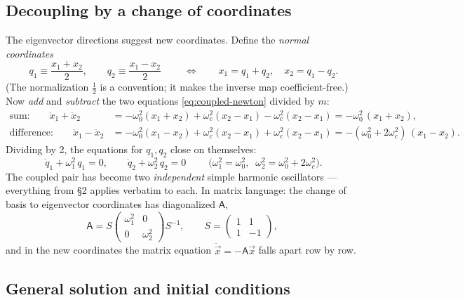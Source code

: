 \documentclass[11pt]{article}
\theoremstyle{plain}
\theoremstyle{definition}
\theoremstyle{remark}
\newcommand{\vx}{\vec{x}}
\newcommand{\mA}{\mathsf{A}}
\begin{document}
\subsection{Decoupling by a change of coordinates}
\label{sec:normal-coords}

The eigenvector directions suggest new coordinates. Define the \emph{normal
coordinates}
\begin{equation}
  \boxed{\;
  q_1 \equiv \frac{x_1 + x_2}{2},
  \qquad
  q_2 \equiv \frac{x_1 - x_2}{2}
  \;}
  \qquad\Longleftrightarrow\qquad
  x_1 = q_1 + q_2, \quad x_2 = q_1 - q_2 .
\end{equation}
(The normalization $\tfrac12$ is a convention; it makes the inverse map
coefficient-free.) Now \emph{add} and \emph{subtract} the two equations
\eqref{eq:coupled-newton} divided by $m$:
\begin{align}
  \text{sum:}\qquad
  \ddot x_1 + \ddot x_2
  &= -\omega_0^2(x_1+x_2) + \omega_c^2(x_2-x_1) - \omega_c^2(x_2 - x_1)
   = -\omega_0^2\,(x_1+x_2), \nonumber\\
  \text{difference:}\qquad
  \ddot x_1 - \ddot x_2
  &= -\omega_0^2(x_1 - x_2) + \omega_c^2(x_2-x_1) + \omega_c^2(x_2-x_1)
   = -(\omega_0^2 + 2\omega_c^2)\,(x_1 - x_2).
\end{align}
Dividing by 2, the equations for $q_1, q_2$ close on themselves:
\begin{equation}
  \boxed{\;
  \ddot q_1 + \omega_1^2\, q_1 = 0,
  \qquad
  \ddot q_2 + \omega_2^2\, q_2 = 0
  \;}
  \qquad
  \bigl(\omega_1^2 = \omega_0^2,\;\; \omega_2^2 = \omega_0^2+2\omega_c^2\bigr).
\end{equation}
The coupled pair has become two \emph{independent} simple harmonic
oscillators --- everything from \S2 applies verbatim to each. In matrix
language: the change of basis to eigenvector coordinates has diagonalized
$\mA$,
\begin{equation}
  \mA = S \begin{pmatrix}\omega_1^2 & 0\\ 0 & \omega_2^2\end{pmatrix}S^{-1},
  \qquad
  S = \begin{pmatrix} 1 & 1\\ 1 & -1\end{pmatrix},
\end{equation}
and in the new coordinates the matrix equation $\ddot\vx = -\mA\vx$ falls
apart row by row.

\subsection{General solution and initial conditions}
\end{document}
